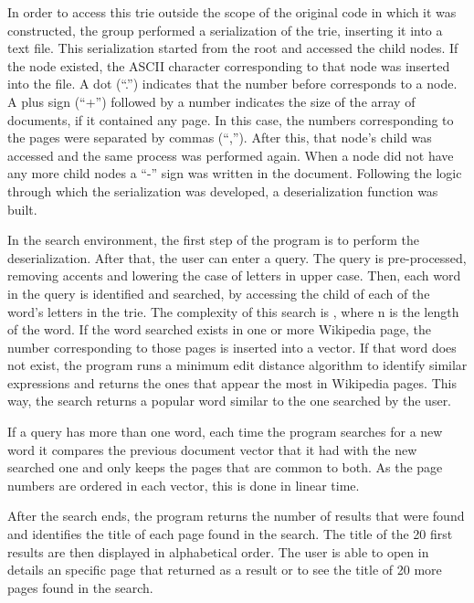 \documentclass{article}
\begin{document}
In order to access this trie outside the scope of the original code in which it was constructed, the group performed a serialization of the trie, inserting it into a text file. This serialization started from the root and accessed the child nodes. If the node existed, the ASCII character corresponding to that node was inserted into the file. A dot (``.'') indicates that the number before corresponds to a node. A plus sign (``+'') followed by a number indicates the size of the array of documents, if it contained any page. In this case, the numbers corresponding to the pages were separated by commas (``,''). After this, that node's child was accessed and the same process was performed again. When a node did not have any more child nodes a ``-'' sign was written in the document. Following the logic through which the serialization was developed, a deserialization function was built. 

In the search environment, the first step of the program is to perform the deserialization. After that, the user can enter a query.  The query is pre-processed, removing accents and lowering the case of letters in upper case. Then, each word in the query is identified and searched, by accessing the child of each of the word's letters in the trie. The complexity of this search is , where n is the length of the word. If the word searched exists in one or more Wikipedia page, the number corresponding to those pages is inserted into a vector. If that word does not exist, the program runs a minimum edit distance algorithm to identify similar expressions and returns the ones that appear the most in Wikipedia pages. This way, the search returns a popular word similar to the one searched by the user. 

If a query has more than one word, each time the program searches for a new word it compares the previous document vector that it had with the new searched one and only keeps the pages that are common to both. As the page numbers are ordered in each vector, this is done in linear time. 

After the search ends, the program returns the number of results that were found and identifies the title of each page found in the search. The title of the 20 first results are then displayed in alphabetical order. The user is able to open in details an specific page that returned as a result or to see the title of 20 more pages found in the search. 

\end{document}
